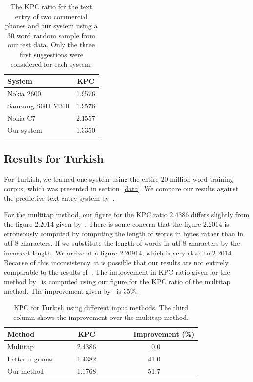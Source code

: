 \documentclass{llncs}
\begin{document}
\begin{table}
\caption{The KPC ratio for the text entry of two commercial phones and
  our system using a $30$ word random sample from our test data. Only
  the three first suggestions were considered for each system.}\label{mobile-phone-kpc}
\begin{center}
\begin{tabular}{lc}
\hline
System & KPC\\
\hline
Nokia 2600       & 1.9576\\
Samsung SGH M310 & 1.9576\\
Nokia C7         & 2.1557\\
Our system       & 1.3350\\
\hline
\end{tabular}
\end{center}
\end{table}

\subsection{Results for Turkish}

For Turkish, we trained one system using the entire $20$ million word
training corpus, which was presented in section~\ref{data}. We compare
our results against the predictive text entry system
by~\cite{Tantug:2010}.

For the multitap method, our figure for the KPC ratio $2.4386$ differs
slightly from the figure $2.2014$ given by~\cite{Tantug:2010}. There
is some concern that the figure $2.2014$ is erroneously computed by
computing the length of words in bytes rather than in utf-8
characters. If we substitute the length of words in utf-8 characters
by the incorrect length. We arrive at a figure $2.20914$, which is
very close to $2.2014$. Because of this inconsistency, it is possible
that our results are not entirely comparable to the results
of~\cite{Tantug:2010}. The improvement in KPC ratio given for the method
by~\cite{Tantug:2010} is computed using our figure for the KPC ratio
of the multitap method. The improvement given by~\cite{Tantug:2010} is
$35\%$.

\begin{table}
\caption{KPC for Turkish using different input methods. The third
  column shows the improvement over the multitap method.}\label{Turkish-kpc-table}
\begin{center}
\begin{tabular}{lcr}
\hline
Method~~~~& ~~~~KPC~~~~ & ~~~~Improvement (\%)\\
\hline
Multitap                          &  2.4386 &0.0~~~~~~~~~~\\
Letter n-grams~\cite{Tantug:2010} &  1.4382 &41.0~~~~~~~~~~\\
Our method                        &  1.1768 &51.7~~~~~~~~~~\\
\hline
\end{tabular}
\end{center}
\end{table}
\end{document}
